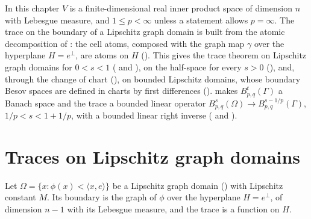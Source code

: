 In this chapter $V$ is a finite-dimensional real inner product space of dimension $n$ with
Lebesgue measure, and $1 \leq p < \infty$ unless a statement allows $p = \infty$. The trace on the
boundary of a Lipschitz graph domain is built from the atomic decomposition of : the
cell atoms, composed with the graph map $\gamma$ over the hyperplane $H = e^\perp$, are atoms on
$H$ (). This gives the trace theorem on Lipschitz graph domains for
$0 < s < 1$ ( and ), on the half-space for
every $s > 0$ (), and, through the change of chart
(), on bounded Lipschitz domains, whose boundary Besov spaces are
defined in charts by first differences ().
 makes $B^t_{p,q}(\Gamma)$ a Banach space and the trace a bounded
linear operator $B^s_{p,q}(\Omega) \to B^{s - 1/p}_{p,q}(\Gamma)$, $1/p < s < 1 + 1/p$, with a
bounded linear right inverse ( and
).

\section{Traces on Lipschitz graph domains}

Let $\Omega = \{x : \phi(x) < \langle x, e \rangle\}$ be a Lipschitz graph domain
() with Lipschitz constant $M$. Its boundary is the graph of $\phi$ over
the hyperplane $H = e^\perp$, of dimension $n - 1$ with its Lebesgue measure, and the trace is a
function on $H$.

